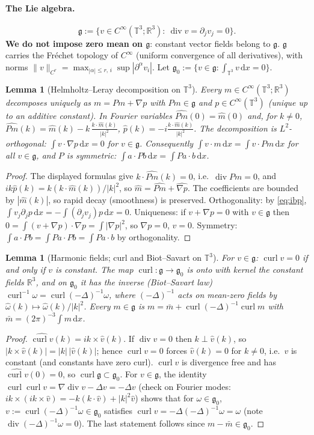 \documentclass[11pt]{article}
\newtheorem{lemma}[theorem]{Lemma}
\theoremstyle{definition}
\newcommand{\T}{\mathbb{T}^3}
\newcommand{\R}{\mathbb{R}}
\newcommand{\g}{\mathfrak{g}}
\newcommand{\dd}{\,\mathrm{d}x}
\newcommand{\curl}{\operatorname{curl}}
\renewcommand{\div}{\operatorname{div}}
\begin{document}
\paragraph{The Lie algebra.}
\[
\g:=\{v\in C^\infty(\T;\R^3):\ \div v=\partial_jv_j=0\}.
\]
\textbf{We do not impose zero mean on $\g$}: constant vector fields belong to $\g$. $\g$ carries the
Fréchet topology of $C^\infty$ (uniform convergence of all derivatives), with norms
$\|v\|_{C^r}=\max_{|\alpha|\le r,\,i}\sup|\partial^\alpha v_i|$. Let
$\g_0:=\{v\in\g:\int_{\T}v\dd=0\}$.

\begin{lemma}[Helmholtz--Leray decomposition on $\T$]\label{lem:leray}
Every $m\in C^\infty(\T;\R^3)$ decomposes uniquely as $m=Pm+\nabla p$ with $Pm\in\g$ and
$p\in C^\infty(\T)$ (unique up to an additive constant). In Fourier variables
$\widehat{Pm}(0)=\hat m(0)$ and, for $k\ne0$,
$\widehat{Pm}(k)=\hat m(k)-k\,\frac{k\cdot\hat m(k)}{|k|^2}$, $\hat p(k)=-i\frac{k\cdot\hat m(k)}{|k|^2}$.
The decomposition is $L^2$-orthogonal: $\int v\cdot\nabla p\dd=0$ for $v\in\g$. Consequently
$\int v\cdot m\dd=\int v\cdot Pm\dd$ for all $v\in\g$, and $P$ is symmetric:
$\int a\cdot Pb\dd=\int Pa\cdot b\dd$.
\end{lemma}
\begin{proof}
The displayed formulas give $k\cdot\widehat{Pm}(k)=0$, i.e.\ $\div Pm=0$, and
$ik\hat p(k)=k(k\cdot\hat m(k))/|k|^2$, so $\hat m=\widehat{Pm}+\widehat{\nabla p}$. The coefficients
are bounded by $|\hat m(k)|$, so rapid decay (smoothness) is preserved. Orthogonality: by
\eqref{eq:ibp}, $\int v_j\partial_jp\dd=-\int(\partial_jv_j)p\dd=0$. Uniqueness: if
$v+\nabla p=0$ with $v\in\g$ then $0=\int(v+\nabla p)\cdot\nabla p=\int|\nabla p|^2$, so $\nabla p=0$,
$v=0$. Symmetry: $\int a\cdot Pb=\int Pa\cdot Pb=\int Pa\cdot b$ by orthogonality.
\end{proof}

\begin{lemma}[Harmonic fields; curl and Biot--Savart on $\T$]\label{lem:curl}
For $v\in\g$: $\curl v=0$ if and only if $v$ is constant. The map $\curl:\g\to\g_0$ is onto with
kernel the constant fields $\R^3$, and on $\g_0$ it has the inverse (Biot--Savart law)
$\curl^{-1}\omega=\curl(-\Delta)^{-1}\omega$, where $(-\Delta)^{-1}$ acts on mean-zero fields by
$\hat\omega(k)\mapsto\hat\omega(k)/|k|^2$. Every $m\in\g$ is $m=\bar m+\curl(-\Delta)^{-1}\curl m$
with $\bar m=(2\pi)^{-3}\int m\dd$.
\end{lemma}
\begin{proof}
$\widehat{\curl v}(k)=ik\times\hat v(k)$. If $\div v=0$ then $k\perp\hat v(k)$, so
$|k\times\hat v(k)|=|k|\,|\hat v(k)|$; hence $\curl v=0$ forces $\hat v(k)=0$ for $k\ne0$, i.e.\ $v$
is constant (and constants have zero curl). $\curl v$ is divergence free and has
$\widehat{\curl v}(0)=0$, so $\curl\g\subset\g_0$. For $v\in\g$, the identity
$\curl\curl v=\nabla\div v-\Delta v=-\Delta v$ (check on Fourier modes:
$ik\times(ik\times\hat v)=-k(k\cdot\hat v)+|k|^2\hat v$) shows that for $\omega\in\g_0$,
$v:=\curl(-\Delta)^{-1}\omega\in\g_0$ satisfies $\curl v=-\Delta(-\Delta)^{-1}\omega=\omega$
(note $\div(-\Delta)^{-1}\omega=0$). The last statement follows since $m-\bar m\in\g_0$.
\end{proof}
\end{document}
